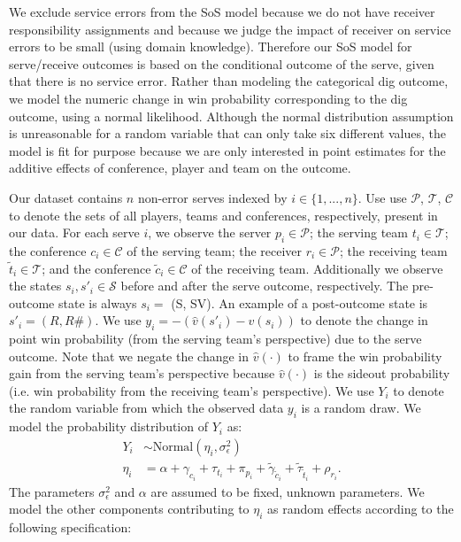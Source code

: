 \documentclass[USenglish]{article}
\theoremstyle{dgthm}
\theoremstyle{dgdef}
\begin{document}
We exclude service errors from the SoS model because we do not have receiver responsibility assignments and because we judge the impact of receiver on service errors to be small (using domain knowledge). Therefore our SoS model for serve/receive outcomes is based on the conditional outcome of the serve, given that there is no service error. Rather than modeling the categorical dig outcome, we model the numeric change in win probability corresponding to the dig outcome, using a normal likelihood. Although the normal distribution assumption is unreasonable for a random variable that can only take six different values, the model is fit for purpose because we are only interested in point estimates for the additive effects of conference, player and team on the outcome.

Our dataset contains $n$ non-error serves indexed by $i \in \{1, ..., n\}$. Use use $\mathcal{P}$, $\mathcal{T}$, $\mathcal{C}$ to denote the sets of all players, teams and conferences, respectively, present in our data. For each serve $i$, we observe the server $p_i \in \mathcal{P}$; the serving team $t_i \in \mathcal{T}$; the conference $c_i \in \mathcal{C}$ of the serving team; the receiver $r_i \in \mathcal{P}$; the receiving team $\tilde t_i \in \mathcal{T}$; and the conference $\tilde c_i \in \mathcal{C}$ of the receiving team. Additionally we observe the states $s_i, s'_i \in \mathcal{S}$ before and after the serve outcome, respectively. The pre-outcome state is always $s_i =$ (S, SV). An example of a post-outcome state is $s'_i = (R, R\#)$. We use $y_i = -(\hat v(s'_i) - \hat v(s_i))$ to denote the change in point win probability (from the serving team's perspective) due to the serve outcome. Note that we negate the change in $\hat v(\cdot)$ to frame the win probability gain from the serving team's perspective because $\hat v(\cdot)$ is the sideout probability (i.e. win probability from the receiving team's perspective). We use $Y_i$ to denote the random variable from which the observed data $y_i$ is a random draw. We model the probability distribution of $Y_i$ as:
\begin{align*}
  Y_i &\sim \mbox{Normal}(\eta_i, \sigma^2_\epsilon)\\
  \eta_i &= \alpha + \gamma_{c_i} + \tau_{t_i} + \pi_{p_i} + \tilde\gamma_{\tilde c_i} + \tilde\tau_{\tilde t_i} + \rho_{r_i}.
\end{align*}
The parameters $\sigma^2_\epsilon$ and $\alpha$ are assumed to be fixed, unknown parameters. We model the other components contributing to $\eta_i$ as random effects according to the following specification:
\end{document}

